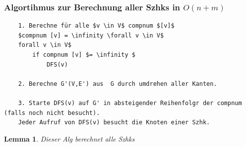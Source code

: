 \documentclass{article}
\newtheorem{lem}[thm]{Lemma}
\begin{document}
\subsubsection{Algortihmus zur Berechnung aller Szhks in $O(n + m)$}
\begin{verbatim}
    1. Berechne für alle $v \in V$ compnum $[v]$
    $compnum [v] = \infinity \forall v \in V$
    forall v \in V$
        if compnum [v] $= \infinity $
            DFS(v)

    2. Berechne G'(V,E') aus  G durch umdrehen aller Kanten.
    
    3. Starte DFS(v) auf G' in absteigender Reihenfolgr der compnum (falls noch nicht besucht).
    Jeder Aufruf von DFS(v) besucht die Knoten einer Szhk.
\end{verbatim}
\begin{lem}
    Dieser Alg berechnet alle Szhks
\end{lem}
\end{document}
